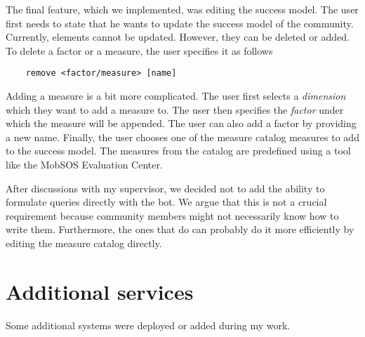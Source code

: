 The final feature, which we implemented, was editing the success model. The user first needs to state that he wants to update the success model of the community.
Currently, elements cannot be updated. 
However, they can be deleted or added. 
To delete a factor or a measure, the user specifies it as follows \begin{lstlisting}
    remove <factor/measure> [name]
\end{lstlisting}  
Adding a measure is a bit more complicated. The user first selects a \emph{dimension} which they want to add a measure to. The user then specifies the \emph{factor} under which the measure will be appended. The user can also add a factor by providing a new name. Finally, the user chooses one of the measure catalog measures to add to the success model. 
The measures from the catalog are predefined using a tool like the MobSOS Evaluation Center. 

After discussions with my supervisor, we decided not to add the ability to formulate queries directly with the bot. 
We argue that this is not a crucial requirement because community members might not necessarily know how to write them. Furthermore, the ones that do can probably do it more efficiently by editing the measure catalog directly.




\section{Additional services}\label{sec:additional}
Some additional systems were deployed or added during my work.

